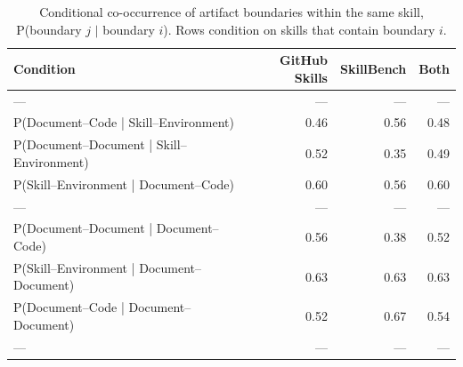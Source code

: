 \begin{table}[t]
  \centering
  \caption{Conditional co-occurrence of artifact boundaries within the same skill, P(boundary $j$ $\mid$ boundary $i$). Rows condition on skills that contain boundary $i$.}
  \label{tab:rq1-cooccurrence-l1}
  \small
  \setlength{\tabcolsep}{4pt}

  \begin{tabular}{lrrr}
    \toprule
    Condition & GitHub Skills & SkillBench & Both \\
    \midrule
    --- & --- & --- & --- \\
    P(Document–Code | Skill–Environment) & 0.46 & 0.56 & 0.48 \\
    P(Document–Document | Skill–Environment) & 0.52 & 0.35 & 0.49 \\
    P(Skill–Environment | Document–Code) & 0.60 & 0.56 & 0.60 \\
    --- & --- & --- & --- \\
    P(Document–Document | Document–Code) & 0.56 & 0.38 & 0.52 \\
    P(Skill–Environment | Document–Document) & 0.63 & 0.63 & 0.63 \\
    P(Document–Code | Document–Document) & 0.52 & 0.67 & 0.54 \\
    --- & --- & --- & --- \\
    \bottomrule
  \end{tabular}
\end{table}

